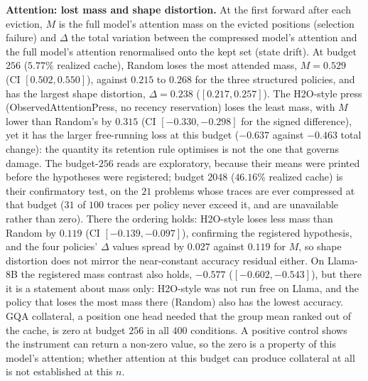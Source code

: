 \documentclass{article}
\begin{document}
\textbf{Attention: lost mass and shape distortion.} At the first forward after
each eviction, $M$ is the full model's attention mass on the evicted positions
(selection failure) and $\Delta$ the total variation between the compressed
model's attention and the full model's attention renormalised onto the kept set
(state drift). At budget $256$ ($5.77\%$ realized cache), Random loses the most
attended mass, $M = 0.529$ (CI $[0.502, 0.550]$), against $0.215$ to $0.268$ for the
three structured policies, and has the largest shape distortion,
$\Delta = 0.238$ ($[0.217, 0.257]$). The H2O-style press (ObservedAttentionPress,
no recency reservation) loses the least mass, with $M$ lower than Random's by $0.315$ (CI
$[-0.330, -0.298]$ for the signed difference), yet it has the larger free-running loss at this
budget ($-0.637$ against $-0.463$ total change): the quantity its retention rule
optimises is not the one that governs damage. The budget-$256$ reads are
exploratory, because their means were printed before the hypotheses were
registered; budget $2048$ ($46.16\%$ realized cache) is their confirmatory test,
on the $21$ problems whose traces are ever compressed at that budget ($31$ of
$100$ traces per policy never exceed it, and are unavailable rather than zero).
There the ordering holds: H2O-style loses less mass than Random by $0.119$ (CI
$[-0.139, -0.097]$), confirming the registered hypothesis, and the four policies'
$\Delta$ values spread by $0.027$ against $0.119$ for $M$, so shape distortion
does not mirror the near-constant accuracy residual either. On Llama-8B the
registered mass contrast also holds, $-0.577$ ($[-0.602, -0.543]$), but there it
is a statement about mass only: H2O-style was not run free on Llama, and the
policy that loses the most mass there (Random) also has the lowest accuracy. GQA
collateral, a position one head needed that the group mean ranked out of the
cache, is zero at budget $256$ in all $400$ conditions. A positive control shows
the instrument can return a non-zero value, so the zero is a property of this
model's attention; whether attention at this budget can produce collateral at
all is not established at this $n$.
\end{document}
